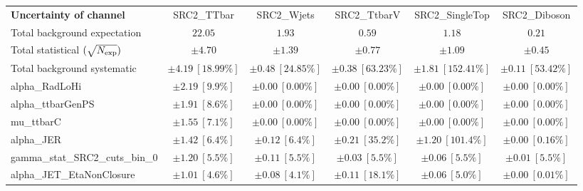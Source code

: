 
\begin{sidewaystable}
\begin{center}
\setlength{\tabcolsep}{0.0pc}
\begin{tabular*}{\textwidth}{@{\extracolsep{\fill}}lccccc}
\noalign{\smallskip}\hline\noalign{\smallskip}
{\bf Uncertainty of channel}                                    & SRC2\_TTbar            & SRC2\_Wjets            & SRC2\_TtbarV            & SRC2\_SingleTop            & SRC2\_Diboson            \\
\noalign{\smallskip}\hline\noalign{\smallskip}
Total background expectation             &  $22.05$        &  $1.93$        &  $0.59$        &  $1.18$        &  $0.21$       \\
\noalign{\smallskip}\hline\noalign{\smallskip}
Total statistical $(\sqrt{N_{\rm exp}})$              & $\pm 4.70$        & $\pm 1.39$        & $\pm 0.77$        & $\pm 1.09$        & $\pm 0.45$       \\
Total background systematic               & $\pm 4.19\ [18.99\%] $        & $\pm 0.48\ [24.85\%] $        & $\pm 0.38\ [63.23\%] $        & $\pm 1.81\ [152.41\%] $        & $\pm 0.11\ [53.42\%] $             \\
\noalign{\smallskip}\hline\noalign{\smallskip}
\noalign{\smallskip}\hline\noalign{\smallskip}
alpha\_RadLoHi         & $\pm 2.19\ [9.9\%] $          & $\pm 0.00\ [0.00\%] $          & $\pm 0.00\ [0.00\%] $          & $\pm 0.00\ [0.00\%] $          & $\pm 0.00\ [0.00\%] $       \\
alpha\_ttbarGenPS         & $\pm 1.91\ [8.6\%] $          & $\pm 0.00\ [0.00\%] $          & $\pm 0.00\ [0.00\%] $          & $\pm 0.00\ [0.00\%] $          & $\pm 0.00\ [0.00\%] $       \\
mu\_ttbarC         & $\pm 1.55\ [7.1\%] $          & $\pm 0.00\ [0.00\%] $          & $\pm 0.00\ [0.00\%] $          & $\pm 0.00\ [0.00\%] $          & $\pm 0.00\ [0.00\%] $       \\
alpha\_JER         & $\pm 1.42\ [6.4\%] $          & $\pm 0.12\ [6.4\%] $          & $\pm 0.21\ [35.2\%] $          & $\pm 1.20\ [101.4\%] $          & $\pm 0.00\ [0.16\%] $       \\
gamma\_stat\_SRC2\_cuts\_bin\_0         & $\pm 1.20\ [5.5\%] $          & $\pm 0.11\ [5.5\%] $          & $\pm 0.03\ [5.5\%] $          & $\pm 0.06\ [5.5\%] $          & $\pm 0.01\ [5.5\%] $       \\
alpha\_JET\_EtaNonClosure         & $\pm 1.01\ [4.6\%] $          & $\pm 0.08\ [4.1\%] $          & $\pm 0.11\ [18.1\%] $          & $\pm 0.06\ [5.0\%] $          & $\pm 0.00\ [0.01\%] $       \\

\end{tabular*}
\end{center}
\end{sidewaystable}
